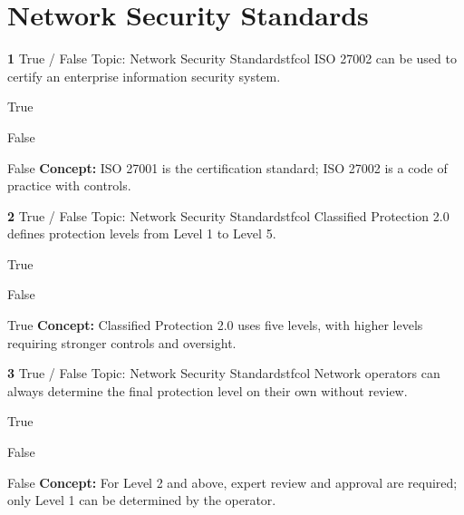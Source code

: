 \documentclass[10pt,a4paper]{article}
\begin{document}
\section{Network Security Standards}
\begin{qcard}{\color{white}\textbf{1} \hfill \small True / False \textbar{} Topic: Network Security Standards}{tfcol}
ISO 27002 can be used to certify an enterprise information security system.

\begin{qoptions}
\item True
\item False
\end{qoptions}
\begin{explainbox}{False}
\textbf{Concept:} ISO 27001 is the certification standard; ISO 27002 is a code of practice with controls.
\end{explainbox}
\end{qcard}

\begin{qcard}{\color{white}\textbf{2} \hfill \small True / False \textbar{} Topic: Network Security Standards}{tfcol}
Classified Protection 2.0 defines protection levels from Level 1 to Level 5.

\begin{qoptions}
\item True
\item False
\end{qoptions}
\begin{explainbox}{True}
\textbf{Concept:} Classified Protection 2.0 uses five levels, with higher levels requiring stronger controls and oversight.
\end{explainbox}
\end{qcard}

\begin{qcard}{\color{white}\textbf{3} \hfill \small True / False \textbar{} Topic: Network Security Standards}{tfcol}
Network operators can always determine the final protection level on their own without review.

\begin{qoptions}
\item True
\item False
\end{qoptions}
\begin{explainbox}{False}
\textbf{Concept:} For Level 2 and above, expert review and approval are required; only Level 1 can be determined by the operator.
\end{explainbox}
\end{qcard}
\end{document}
